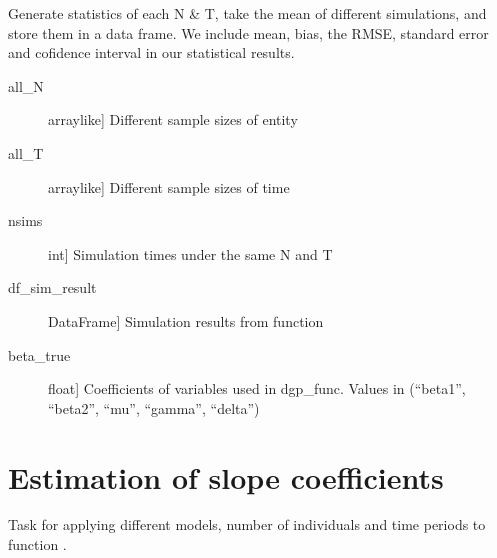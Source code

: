 \documentclass[a4paper,11pt,english]{sphinxmanual}
\begin{document}
\begin{fulllineitems}
\label{\detokenize{analysis:src.analysis.simulation.statistics_coefficient}}
\sphinxAtStartPar
Generate statistics of each N \& T, take the mean of different simulations, and
store them in a data frame. We include mean, bias, the RMSE, standard error and
cofidence interval in our statistical results.
\begin{description}
\item[{all\_N}] \leavevmode{[}array\sphinxhyphen{}like{]}
\sphinxAtStartPar
Different sample sizes of entity

\item[{all\_T}] \leavevmode{[}array\sphinxhyphen{}like{]}
\sphinxAtStartPar
Different sample sizes of time

\item[{nsims}] \leavevmode{[}int{]}
\sphinxAtStartPar
Simulation times under the same N and T

\item[{df\_sim\_result}] \leavevmode{[}DataFrame{]}
\sphinxAtStartPar
Simulation results from function 

\item[{beta\_true}] \leavevmode{[}float{]}
\sphinxAtStartPar
Coefficients of variables used in dgp\_func. Values in (“beta1”, “beta2”, “mu”,
“gamma”, “delta”)

\end{description}

\end{fulllineitems}



\section{Estimation of slope coefficients}
\label{\detokenize{analysis:module-src.analysis.task_simulation_coefficient}}\label{\detokenize{analysis:estimation-of-slope-coefficients}}\label{\detokenize{analysis:src-analysis-task-simulation-coefficient}}
\sphinxAtStartPar
Task for applying different models, number of individuals and time periods to function
.
\end{document}
